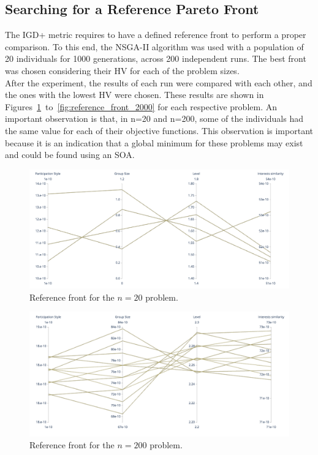\subsection{Searching for a Reference Pareto Front}

The IGD+ metric requires to have a defined reference front to perform a proper comparison. To this end, the NSGA-II algorithm was used with a population of 20 individuals for 1000 generations, across 200 independent runs. The best front was chosen considering their HV for each of the problem sizes.\\

After the experiment, the results of each run were compared with each other, and the ones with the lowest HV were chosen. These results are shown in Figures~\ref{fig:reference_front_20}~to~\ref{fig:reference_front_2000} for each respective problem. An important observation is that, in n=20 and n=200, some of the individuals had the same value for each of their objective functions. This observation is important because it is an indication that a global minimum for these problems may exist and could be found using an SOA.\\

\begin{figure}[H]
    \centering
    \includegraphics[width=\textwidth]{images/parallel_ref_20.png}
    \caption{Reference front for the $n=20$ problem.}
    \label{fig:reference_front_20}
\end{figure}

\begin{figure}[H]
    \centering
    \includegraphics[width=\textwidth]{images/parallel_ref_200.png}
    \caption{Reference front for the $n=200$ problem. }
    \label{fig:reference_front_200}
\end{figure}

